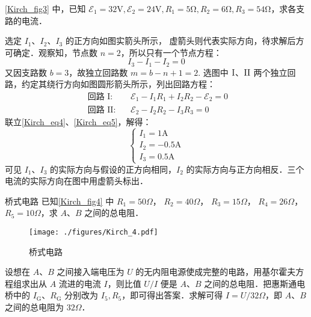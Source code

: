 \begin{example}{}
\autoref{Kirch_fig3} 中，已知 $\mathscr{E}_{1}=32 \mathrm{V}, \mathscr{E}_{2}=24 \mathrm{V}, R_{1}=5 \mathrm{\Omega}, R_{2}=6 \mathrm{\Omega}, R_{3}=54 \mathrm{\Omega}$，求各支路的电流．

选定 $I_1$、$I_2$、$I_3$ 的正方向如图实箭头所示， 虚箭头则代表实际方向，待求解后方可确定．观察知，节点数 $n =2$，所以只有一个节点方程：
\begin{equation} \label{Kirch_eq4}
I_{3}-I_{1}-I_{2}=0
\end{equation}
又因支路数 $b=3$，故独立回路数 $m = b - n + 1 =2 $. 选图中 $\rm I$、$\rm II$ 两个独立回路，约定其绕行方向如图圆形箭头所示，列出回路方程：
\begin{equation} \label{Kirch_eq5}
\begin{aligned}\text { 回路 } \mathrm{I}: && \mathscr{E}_{1} - I_{1} R_{1} + I_{2} R_{2} -\mathscr{E}_{2} = 0\\ \text { 回路 } \mathrm{II}: && \mathscr{E}_{2} - I_{2} R_{2} - I_{3} R_{3} = 0\end{aligned}
\end{equation}
联立\autoref{Kirch_eq4}、\autoref{Kirch_eq5}，解得：
\begin{equation}
\begin{cases}
I_{1}=1 \mathrm{A} \\ 
I_{2}=-0.5 \mathrm{A} \\
I_{3}=0.5 \mathrm{A}
\end{cases}
\end{equation}
可见 $I_1$、$I_3$ 的实际方向与假设的正方向相同，$I_2$ 的实际方向与正方向相反．三个电流的实际方向在图中用虚箭头标出．
\end{example}

\begin{example}{桥式电路}
已知\autoref{Kirch_fig4} 中 $R_{1}=50 \Omega$， $ R_{2}=40 \Omega$， $ R_{3}=15 \Omega$， $ R_{4}=26 \Omega$， $ R_{5}=10 \Omega$，求 $A $、$B $ 之间的总电阻．
\begin{figure}[ht]
\centering
\texttt{[image: ./figures/Kirch\_4.pdf]}
\caption{桥式电路} \label{Kirch_fig4}
\end{figure}

设想在 $A $、$B $ 之间接入端电压为 $U $ 的无内阻电源使成完整的电路，用基尔霍夫方程组求出从 $A $ 流进的电流 $I$，则比值 $U/I$ 便是 $A$、$B$ 之间的总电阻．把惠斯通电桥中的 $I_\mathrm{G}$、$R_\mathrm{G}$ 分别改为 $I_5,R_5$，即可得出答案．求解可得 $I=U/32\Omega$，即 $A$、$B$ 之间的总电阻为 $32\Omega$．
\end{example}
